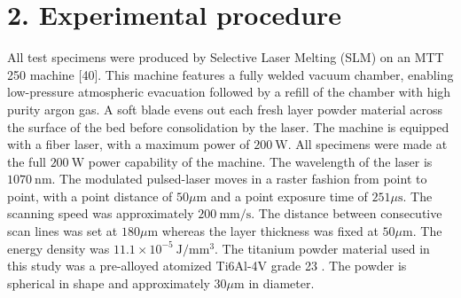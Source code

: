 \documentclass[10pt]{article}
\begin{document}
\section*{2. Experimental procedure}
All test specimens were produced by Selective Laser Melting (SLM) on an MTT 250 machine [40]. This machine features a fully welded vacuum chamber, enabling low-pressure atmospheric evacuation followed by a refill of the chamber with high purity argon gas. A soft blade evens out each fresh layer powder material across the surface of the bed before consolidation by the laser. The machine is equipped with a fiber laser, with a maximum power of $200 \mathrm{~W}$. All specimens were made at the full $200 \mathrm{~W}$ power capability of the machine. The wavelength of the laser is $1070 \mathrm{~nm}$. The modulated pulsed-laser moves in a raster fashion from point to point, with a point distance of $50 \mu \mathrm{m}$ and a point exposure time of $251 \mu \mathrm{s}$. The scanning speed was approximately $200 \mathrm{~mm} / \mathrm{s}$. The distance between consecutive scan lines was set at $180 \mu \mathrm{m}$ whereas the layer thickness was fixed at $50 \mu \mathrm{m}$. The energy density was $11.1 \times 10^{-5} \mathrm{~J} / \mathrm{mm}^{3}$. The titanium powder material used in this study was a pre-alloyed atomized Ti6Al-4V grade 23 . The powder is spherical in shape and approximately $30 \mu \mathrm{m}$ in diameter.
\end{document}
